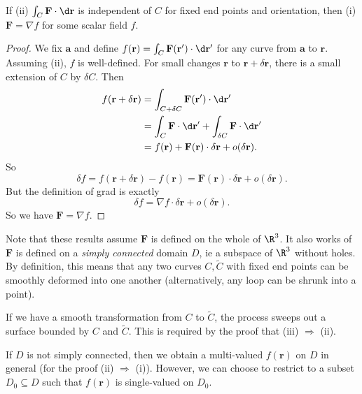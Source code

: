 \documentclass[a4paper]{article}
\begin{document}
\begin{prop}
  If (ii) $\int_C \mathbf{F}\cdot \d \mathbf{r}$ is independent of $C$ for fixed end points and orientation, then (i) $\mathbf{F} = \nabla f$ for some scalar field $f$.
\end{prop}

\begin{proof}
  We fix $\mathbf{a}$ and define $f(\mathbf{r}) = \int_C \mathbf{F}(\mathbf{r}')\cdot\d \mathbf{r}'$ for any curve from $\mathbf{a}$ to $\mathbf{r}$. Assuming (ii), $f$ is well-defined. For small changes $\mathbf{r}$ to $\mathbf{r} + \delta \mathbf{r}$, there is a small extension of $C$ by $\delta C$. Then
  \begin{align*}
    f(\mathbf{r} + \delta \mathbf{r}) &= \int_{C + \delta C}\mathbf{F} (\mathbf{r}')\cdot \d \mathbf{r}'\\
    &= \int_C \mathbf{F}\cdot \d \mathbf{r}' + \int_{\delta C}\mathbf{F}\cdot \d \mathbf{r}'\\
    &= f(\mathbf{r}) + \mathbf{F}(\mathbf{r})\cdot \delta \mathbf{r} + o(\delta \mathbf{r}).
  \end{align*}
  So
  \[
    \delta f = f(\mathbf{r} + \delta \mathbf{r}) - f(\mathbf{r}) = \mathbf{F}(\mathbf{r})\cdot \delta \mathbf{r} + o(\delta \mathbf{r}).
  \]
  But the definition of grad is exactly
  \[
    \delta f = \nabla f\cdot \delta \mathbf{r} + o(\delta \mathbf{r}).
  \]
  So we have $\mathbf{F} = \nabla f$.
\end{proof}
Note that these results assume $\mathbf{F}$ is defined on the whole of $\R^3$. It also works of $\mathbf{F}$ is defined on a \emph{simply connected} domain $D$, ie a subspace of $\R^3$ without holes. By definition, this means that any two curves $C, \tilde{C}$ with fixed end points can be smoothly deformed into one another (alternatively, any loop can be shrunk into a point).

If we have a smooth transformation from $C$ to $\tilde{C}$, the process sweeps out a surface bounded by $C$ and $\tilde{C}$. This is required by the proof that (iii) $\Rightarrow$ (ii).

If $D$ is not simply connected, then we obtain a multi-valued $f(\mathbf{r})$ on $D$ in general (for the proof (ii) $\Rightarrow$ (i)). However, we can choose to restrict to a subset $D_0\subseteq D$ such that $f(\mathbf{r})$ is single-valued on $D_0$.
\end{document}
